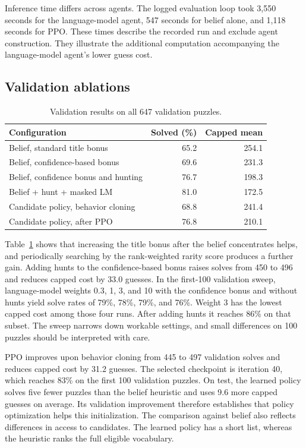 \documentclass[conference]{IEEEtran}
\begin{document}
Inference time differs across agents. The logged evaluation loop took 3,550 seconds for the language-model agent, 547 seconds for belief alone, and 1,118 seconds for PPO. These times describe the recorded run and exclude agent construction. They illustrate the additional computation accompanying the language-model agent's lower guess cost.

\subsection{Validation ablations}
\begin{table}[t]
\centering
\caption{Validation results on all 647 validation puzzles.}
\label{tab:val}
\begin{tabular}{lrr}
\toprule
Configuration & Solved (\%) & Capped mean \\
\midrule
Belief, standard title bonus & 65.2 & 254.1 \\
Belief, confidence-based bonus & 69.6 & 231.3 \\
Belief, confidence bonus and hunting & 76.7 & 198.3 \\
Belief + hunt + masked LM & 81.0 & 172.5 \\
Candidate policy, behavior cloning & 68.8 & 241.4 \\
Candidate policy, after PPO & 76.8 & 210.1 \\
\bottomrule
\end{tabular}
\end{table}

Table~\ref{tab:val} shows that increasing the title bonus after the belief concentrates helps, and periodically searching by the rank-weighted rarity score produces a further gain. Adding hunts to the confidence-based bonus raises solves from 450 to 496 and reduces capped cost by 33.0 guesses. In the first-100 validation sweep, language-model weights 0.3, 1, 3, and 10 with the confidence bonus and without hunts yield solve rates of 79\%, 78\%, 79\%, and 76\%. Weight 3 has the lowest capped cost among those four runs. After adding hunts it reaches 86\% on that subset. The sweep narrows down workable settings, and small differences on 100 puzzles should be interpreted with care.

PPO improves upon behavior cloning from 445 to 497 validation solves and reduces capped cost by 31.2 guesses. The selected checkpoint is iteration 40, which reaches 83\% on the first 100 validation puzzles. On test, the learned policy solves five fewer puzzles than the belief heuristic and uses 9.6 more capped guesses on average. Its validation improvement therefore establishes that policy optimization helps this initialization. The comparison against belief also reflects differences in access to candidates. The learned policy has a short list, whereas the heuristic ranks the full eligible vocabulary.
\end{document}
